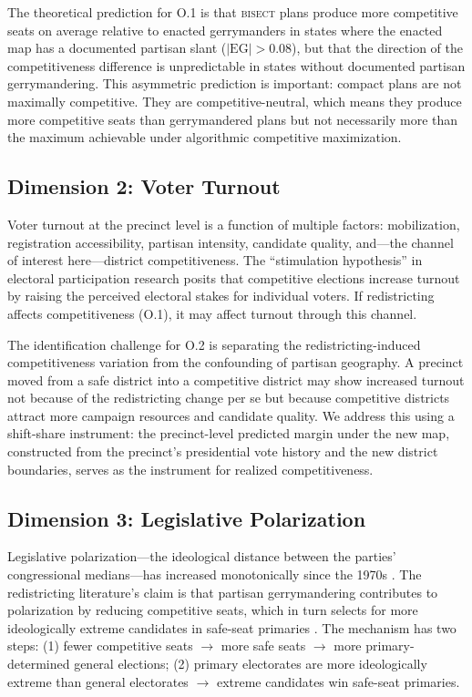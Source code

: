 The theoretical prediction for O.1 is that \textsc{bisect} plans produce more competitive
seats on average relative to enacted gerrymanders in states where the enacted map
has a documented partisan slant ($|\text{EG}| > 0.08$), but that the direction of the
competitiveness difference is unpredictable in states without documented partisan
gerrymandering. This asymmetric prediction is important: compact plans are not
maximally competitive. They are competitive-neutral, which means they produce
more competitive seats than gerrymandered plans but not necessarily more than the
maximum achievable under algorithmic competitive maximization.

\subsection{Dimension 2: Voter Turnout}

Voter turnout at the precinct level is a function of multiple factors: mobilization,
registration accessibility, partisan intensity, candidate quality, and---the channel
of interest here---district competitiveness. The ``stimulation hypothesis'' in electoral
participation research \citep{hays1997} posits that competitive elections increase
turnout by raising the perceived electoral stakes for individual voters. If redistricting
affects competitiveness (O.1), it may affect turnout through this channel.

The identification challenge for O.2 is separating the redistricting-induced competitiveness
variation from the confounding of partisan geography. A precinct moved from a safe district
into a competitive district may show increased turnout not because of the redistricting
change per se but because competitive districts attract more campaign resources and
candidate quality. We address this using a shift-share instrument: the precinct-level
predicted margin under the new map, constructed from the precinct's presidential vote
history and the new district boundaries, serves as the instrument for realized competitiveness.

\subsection{Dimension 3: Legislative Polarization}

Legislative polarization---the ideological distance between the parties' congressional
medians---has increased monotonically since the 1970s \citep{mccarty2006}. The
redistricting literature's claim is that partisan gerrymandering contributes to
polarization by reducing competitive seats, which in turn selects for more
ideologically extreme candidates in safe-seat primaries \citep{fiorina2008}. The
mechanism has two steps: (1) fewer competitive seats $\to$ more safe seats $\to$
more primary-determined general elections; (2) primary electorates are more ideologically
extreme than general electorates $\to$ extreme candidates win safe-seat primaries.

